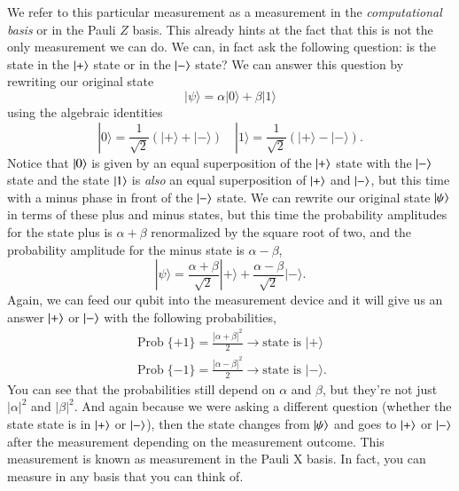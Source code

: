 We refer to this particular measurement as a measurement in the \emph{computational basis} or in the Pauli $Z$ basis. This already hints at the fact that this is not the only measurement we can do. We can, in fact ask the following question: is the state in the $\ket{+}$ state or in the $\ket{-}$ state? We can answer this question by rewriting our original state
\begin{equation}
|\psi\rangle=\alpha|0\rangle+\beta|1\rangle
\end{equation}
using the algebraic identities
\begin{equation}
|0\rangle=\frac{1}{\sqrt{2}}(|+\rangle+|-\rangle) \quad|1\rangle=\frac{1}{\sqrt{2}}(|+\rangle-|-\rangle).
\end{equation}
Notice that $\ket{0}$ is given by an equal superposition of the $\ket{+}$ state with the $\ket{-}$ state and the state $\ket{1}$ is \emph{also} an equal superposition of $\ket{+}$ and $\ket{-}$, but this time with a minus phase in front of the $\ket{-}$ state. We can rewrite our original state $\ket{\psi}$ in terms of these plus and minus states, but this time the probability amplitudes for the state plus is $\alpha+\beta$ renormalized by the square root of two, and the probability amplitude for the minus state is $\alpha-\beta$,
\begin{equation}
|\psi\rangle=\frac{\alpha+\beta}{\sqrt{2}}|+\rangle+\frac{\alpha-\beta}{\sqrt{2}}|-\rangle.
\end{equation}
Again, we can feed our qubit into the measurement device and it will give us an answer $\ket{+}$ or $\ket{-}$ with the following probabilities,
\begin{align}
\operatorname{Prob}\{+1\}=\frac{|\alpha+\beta|^2}{2} \rightarrow \textrm{state is } |+\rangle \\
\operatorname{Prob}\{-1\}=\frac{|\alpha-\beta|^2}{2} \rightarrow \textrm{state is } |-\rangle.
\end{align}
You can see that the probabilities still depend on $\alpha$ and $\beta$, but they're not just $|\alpha|^2$ and $|\beta|^2$.
And again because we were asking a different question (whether the state state is in $\ket{+}$ or $\ket{-}$), then the state changes from $\ket{\psi}$ and goes to $\ket{+}$ or $\ket{-}$ after the measurement depending on the measurement outcome. This measurement is known as measurement in the Pauli X basis.  In fact, you can measure in any basis that you can think of.  

